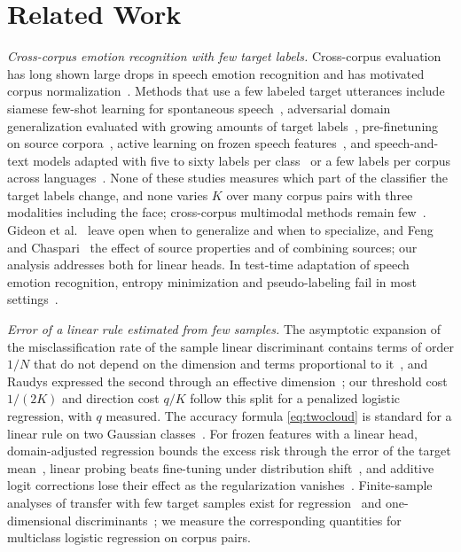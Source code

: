 \section{Related Work}
\label{sec:related}

\emph{Cross-corpus emotion recognition with few target labels.}
Cross-corpus evaluation has long shown large drops in speech emotion recognition and has motivated corpus normalization~\cite{schuller2010crosscorpus}.
Methods that use a few labeled target utterances include siamese few-shot learning for spontaneous speech~\cite{feng2023fewshot}, adversarial domain generalization evaluated with growing amounts of target labels~\cite{gideon2021addog}, pre-finetuning on source corpora~\cite{chen2023prefinetuning}, active learning on frozen speech features~\cite{xu2024crosstask}, and speech-and-text models adapted with five to sixty labels per class~\cite{he2025m4ser} or a few labels per corpus across languages~\cite{zaidi2024enhancing}.
None of these studies measures which part of the classifier the target labels change, and none varies $K$ over many corpus pairs with three modalities including the face; cross-corpus multimodal methods remain few~\cite{ahn2025multitask}.
Gideon et al.~\cite{gideon2021addog} leave open when to generalize and when to specialize, and Feng and Chaspari~\cite{feng2023fewshot} the effect of source properties and of combining sources; our analysis addresses both for linear heads.
In test-time adaptation of speech emotion recognition, entropy minimization and pseudo-labeling fail in most settings~\cite{dong2026test}.

\emph{Error of a linear rule estimated from few samples.}
The asymptotic expansion of the misclassification rate of the sample linear discriminant contains terms of order $1/N$ that do not depend on the dimension and terms proportional to it~\cite{okamoto1963asymptotic}, and Raudys expressed the second through an effective dimension~\cite{raudys1998intrinsic}; our threshold cost $1/(2K)$ and direction cost $q/K$ follow this split for a penalized logistic regression, with $q$ measured.
The accuracy formula \eqref{eq:twocloud} is standard for a linear rule on two Gaussian classes~\cite{desilva2023value,dobriban2018highdimensional}.
For frozen features with a linear head, domain-adjusted regression bounds the excess risk through the error of the target mean~\cite{rosenfeld2022domainadjusted}, linear probing beats fine-tuning under distribution shift~\cite{kumar2022lpft}, and additive logit corrections lose their effect as the regularization vanishes~\cite{kini2021labelimbalanced}.
Finite-sample analyses of transfer with few target samples exist for regression~\cite{ha2026labeled} and one-dimensional discriminants~\cite{desilva2023value}; we measure the corresponding quantities for multiclass logistic regression on corpus pairs.

